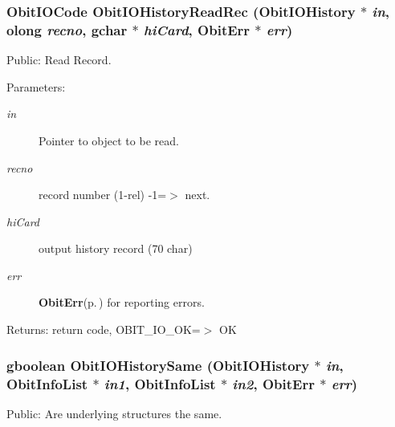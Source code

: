 \subsubsection{\setlength{\rightskip}{0pt plus 5cm}Obit\-IOCode Obit\-IOHistory\-Read\-Rec ({\bf Obit\-IOHistory} $\ast$ {\em in}, {\bf olong} {\em recno}, gchar $\ast$ {\em hi\-Card}, {\bf Obit\-Err} $\ast$ {\em err})}\label{ObitIOHistory_8h_a15}


Public: Read Record. 

\begin{Desc}
\item[Parameters:]
\begin{description}
\item[{\em in}]Pointer to object to be read. \item[{\em recno}]record number (1-rel) -1=$>$ next. \item[{\em hi\-Card}]output history record (70 char) \item[{\em err}]{\bf Obit\-Err}{\rm (p.\,\pageref{structObitErr})} for reporting errors. \end{description}
\end{Desc}
\begin{Desc}
\item[Returns:]return code, OBIT\_\-IO\_\-OK=$>$ OK \end{Desc}
\subsubsection{\setlength{\rightskip}{0pt plus 5cm}gboolean Obit\-IOHistory\-Same ({\bf Obit\-IOHistory} $\ast$ {\em in}, {\bf Obit\-Info\-List} $\ast$ {\em in1}, {\bf Obit\-Info\-List} $\ast$ {\em in2}, {\bf Obit\-Err} $\ast$ {\em err})}\label{ObitIOHistory_8h_a9}


Public: Are underlying structures the same. 

